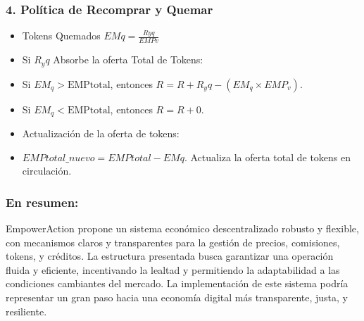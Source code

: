 \documentclass{article}
\begin{document}
\subsubsection*{4. Política de Recomprar y Quemar}
\begin{itemize}
    \item Tokens Quemados \(EMq = \frac{Ryq}{EMPv}\)
    \item Si \(R_yq\) Absorbe la oferta Total de Tokens:
    \item Si \(EM_q > \text{EMPtotal}\), entonces \(R = R + R_yq - (EM_q \times EMP_v)\).
    \item Si \(EM_q < \text{EMPtotal}\), entonces \(R = R + 0\).
    \item Actualización de la oferta de tokens:
    \item \(EMPtotal\_nuevo = EMPtotal - EMq\). Actualiza la oferta total de tokens en circulación.
\end{itemize}


\subsubsection*{En resumen:}
EmpowerAction propone un sistema económico descentralizado robusto y flexible, con mecanismos claros y transparentes para la gestión de precios, comisiones, tokens, y créditos. La estructura presentada busca garantizar una operación fluida y eficiente, incentivando la lealtad y permitiendo la adaptabilidad a las condiciones cambiantes del mercado. La implementación de este sistema podría representar un gran paso hacia una economía digital más transparente, justa, y resiliente.
\end{document}
